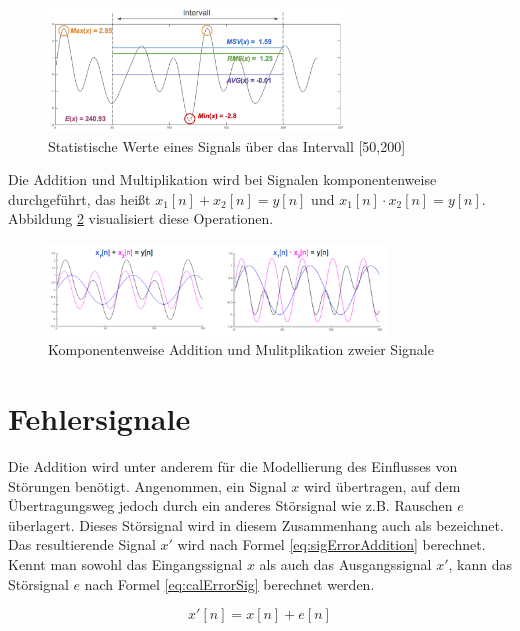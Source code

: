\begin{figure}[h]
	\centering
	\includegraphics[width=0.7\textwidth]{bilder/sigStats.png}
	\caption{Statistische Werte eines Signals über das Intervall [50,200]}
	\label{img:sigStats}
\end{figure}

Die Addition und Multiplikation wird bei Signalen komponentenweise durchgeführt, das heißt $x_1[n] + x_2[n] = y[n] $ und $x_1[n] \cdot x_2[n] = y[n] $. Abbildung \ref{img:addAndMultSig} visualisiert diese Operationen. 

\begin{figure}[h]
	\centering
	\includegraphics[width=0.8\textwidth]{bilder/addAndMultSig.png}
	\caption{Komponentenweise Addition und Mulitplikation zweier Signale}
	\label{img:addAndMultSig}
\end{figure}

\section{Fehlersignale}

Die Addition wird unter anderem für die Modellierung des Einflusses von Störungen benötigt. Angenommen, ein Signal $x$ wird übertragen, auf dem Übertragungsweg jedoch durch ein anderes Störsignal wie z.B. Rauschen $e$ überlagert. Dieses Störsignal wird in diesem Zusammenhang auch als  bezeichnet. Das resultierende Signal $x'$ wird nach Formel \ref{eq:sigErrorAddition} berechnet. Kennt man sowohl das Eingangssignal $x$ als auch das Ausgangssignal $x'$, kann das Störsignal $e$ nach Formel \ref{eq:calErrorSig} berechnet werden.

\begin{equation}
x'[n] = x[n] + e[n]
\label{eq:sigErrorAddition}
\end{equation}

